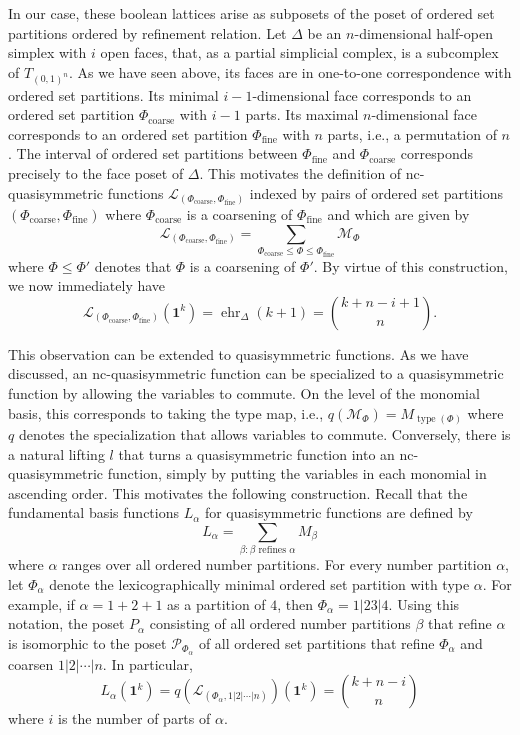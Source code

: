 \documentclass[12pt,reqno]{amsart}
\numberwithin{definition}{section}
\theoremstyle{definition}
\newcommand{\ehr}{\operatorname{ehr}}
\newcommand{\ncM}{\mathcal{M}}
\newcommand{\ncL}{\mathcal{L}}
\newcommand{\T}{T} %
\newcommand{\TC}{\T_{(0,1)^n}} %
\begin{document}
In our case, these boolean lattices arise as subposets of the poset of ordered set partitions ordered by refinement relation. Let $\Delta$ be an $n$-dimensional half-open simplex with $i$ open faces, that, as a partial simplicial complex, is a subcomplex of $\TC$. As we have seen above, its faces are in one-to-one correspondence with ordered set partitions. Its minimal $i-1$-dimensional face corresponds to an ordered set partition $\Phi_\text{coarse}$ with $i-1$ parts. Its maximal $n$-dimensional face corresponds to an ordered set partition $\Phi_\text{fine}$ with $n$ parts, i.e., a permutation of $n$. The interval of ordered set partitions between $\Phi_\text{fine}$ and $\Phi_\text{coarse}$ corresponds precisely to the face poset of $\Delta$. This motivates the definition of nc-quasisymmetric functions $\ncL_{(\Phi_\text{coarse},\Phi_\text{fine})}$ indexed by pairs of ordered set partitions $(\Phi_\text{coarse},\Phi_\text{fine})$ where $\Phi_\text{coarse}$ is a coarsening of $\Phi_\text{fine}$ and which are given by
\[
  \ncL_{(\Phi_\text{coarse},\Phi_\text{fine})} = \sum_{\Phi_\text{coarse}\leq \Phi \leq \Phi_\text{fine}} \ncM_\Phi
\]
where $\Phi\leq\Phi'$ denotes that $\Phi$ is a coarsening of $\Phi'$. By virtue of this construction, we now immediately have
\[
  \ncL_{(\Phi_\text{coarse},\Phi_\text{fine})}(\mathbf{1}^k) = \ehr_\Delta(k+1) = \binom{k+n-i+1}{n}.
\]

This observation can be extended to quasisymmetric functions. As we have discussed, an nc-quasisymmetric function can be specialized to a quasisymmetric function by allowing the variables to commute. On the level of the monomial basis, this corresponds to taking the type map, i.e., $q(\ncM_\Phi)=M_{\operatorname{type}(\Phi)}$ where $q$ denotes the specialization that allows variables to commute. Conversely, there is a natural lifting $l$ that turns a quasisymmetric function into an nc-quasisymmetric function, simply by putting the variables in each monomial in ascending order. This motivates the following construction. Recall that the fundamental basis functions $L_\alpha$ for quasisymmetric functions are defined by
\[
  L_\alpha = \sum_{\beta: \beta\text{ refines }\alpha} M_\beta
\]
where $\alpha$ ranges over all ordered number partitions. For every number partition $\alpha$, let $\Phi_\alpha$ denote the lexicographically minimal ordered set partition with type $\alpha$. For example, if $\alpha=1+2+1$ as a partition of $4$, then $\Phi_\alpha=1|23|4$. Using this notation, the poset $P_\alpha$ consisting of all ordered number partitions $\beta$ that refine $\alpha$ is isomorphic to the poset $\mathcal{P}_{\Phi_\alpha}$ of all ordered set partitions that refine $\Phi_\alpha$ and coarsen $1|2|\cdots|n$. In particular,
\[
  L_\alpha(\mathbf{1}^k) = q(\ncL_{(\Phi_\alpha,1|2|\cdots|n)})(\mathbf{1}^k) = \binom{k+n-i}{n}
\]
where $i$ is the number of parts of $\alpha$.
\end{document}
